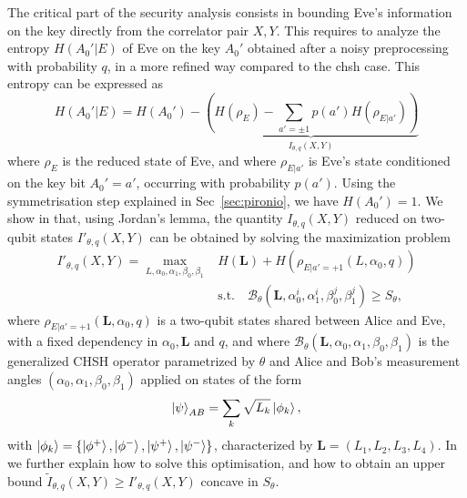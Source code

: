 The critical part of the security analysis consists in bounding Eve's information on the key directly from the correlator pair $X,Y$.
This requires to analyze the entropy $H(A_0'|E)$ of Eve on the key $A_0'$ obtained after a noisy preprocessing with probability $q$, in a more refined way compared to the \acrshort{chsh} case.
This entropy can be expressed as 
\begin{equation}
	H(A_0'|E) = H(A_0') - \underbrace{\left(H(\rho_E) - \sum_{a'=\pm1}p(a')H(\rho_{E|a'})\right)}_{I_{\theta,q}(X,Y)}
\end{equation}
where $\rho_E$ is the reduced state of Eve, and where $\rho_{E|a'}$ is Eve's state conditioned on the key bit $A_0'=a'$, occurring with probability $p(a')$.
Using the symmetrisation step explained in Sec~\ref{sec:pironio}, we have $H(A_0')=1$.
We show in \cite{Sekatski2021} that, using Jordan's lemma, the quantity $I_{\theta,q}(X,Y)$ reduced on two-qubit states $I'_{\theta,q}(X,Y)$ can be obtained by solving the maximization problem
\begin{equation}
	\begin{split}
		I'_{\theta,q}(X,Y) = \max_{L,\alpha_0,\alpha_1,\beta_0,\beta_1} & H(\mathbf{L}) + H(\rho_{E|a'=+1}(L,\alpha_0,q)) \\
		&\mathrm{s.t.}\quad 
		\mathcal{B}_\theta (\mathbf{L},\alpha_0^i,\alpha_1^i,\beta_0^j,\beta_1^j) \geq S_\theta,
	\end{split}
\end{equation}
where $\rho_{E|a'=+1}(\mathbf{L},\alpha_0,q)$ is a two-qubit states shared between Alice and Eve, with a fixed dependency in $\alpha_0,\mathbf{L}$ and $q$, and where $\mathcal{B}_\theta (\mathbf{L},\alpha_0,\alpha_1,\beta_0,\beta_1)$ is the generalized CHSH operator parametrized by $\theta$ and Alice and Bob's measurement angles $(\alpha_0,\alpha_1,\beta_0,\beta_1)$ applied on states of the form
\begin{equation}
	\ket{\psi}_{AB} = \sum_k \sqrt{L_k} \ket{\phi_k},
	\label{eq:}
\end{equation}
with $\ket{\phi_k}=\{\ket{\phi^+},\ket{\phi^-},\ket{\psi^+},\ket{\psi^-}\}$, characterized by $\mathbf{L}=(L_1,L_2,L_3,L_4)$.
In \cite{Sekatski2021} we further explain how to solve this optimisation, and how to obtain an upper bound $\tilde{I}_{\theta,q}(X,Y)\geq I'_{\theta,q}(X,Y)$ concave in $S_\theta$.

